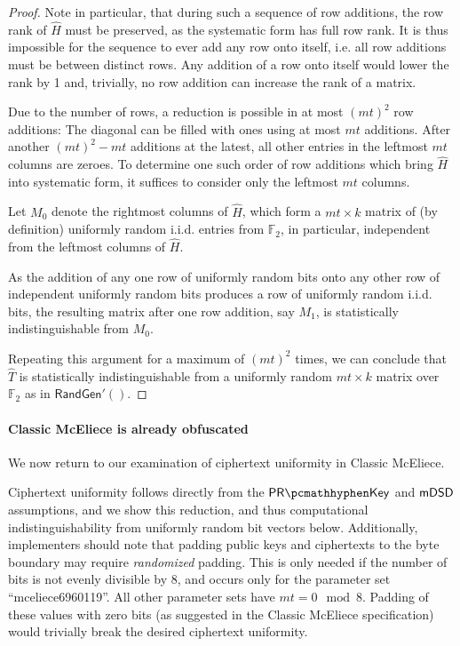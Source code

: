 \begin{proof}
    Note in particular, that during such a sequence of row additions, the row rank of $\hat H$ must be preserved, as the systematic form has full row rank. It is thus impossible for the sequence to ever add any row onto itself, i.e. all row additions must be between distinct rows. Any addition of a row onto itself would lower the rank by 1 and, trivially, no row addition can increase the rank of a matrix.
    
    Due to the number of rows, a reduction is possible in at most $(mt)^2$ row additions: The diagonal can be filled with ones using at most $mt$ additions. After another $(mt)^2-mt$ additions at the latest, all other entries in the leftmost $mt$ columns are zeroes. To determine one such order of row additions which bring $\hat H$ into systematic form, it suffices to consider only the leftmost $mt$ columns.
    
    Let $M_0$ denote the rightmost columns of $\hat H$, which form a $mt \times k$ matrix of (by definition) uniformly random i.i.d. entries from $\mathbb F_2$, in particular, independent from the leftmost columns of $\hat H$.
    
    As the addition of any one row of uniformly random bits onto any other row of independent uniformly random bits produces a row of uniformly random i.i.d. bits, the resulting matrix after one row addition, say $M_1$, is statistically indistinguishable from $M_0$.
    
    Repeating this argument for a maximum of $(mt)^2$ times, we can conclude that $\hat T$ is statistically indistinguishable from a uniformly random $mt \times k$ matrix over $\mathbb F_2$ as in $\mathsf{RandGen}'()$.
\end{proof}

\paragraph{Classic McEliece is already obfuscated}
We now return to our examination of ciphertext uniformity in Classic McEliece.

Ciphertext uniformity follows directly from the $\prkey$ and $\mathsf{mDSD}$ assumptions, and we show this reduction, and thus computational indistinguishability from uniformly random bit vectors below. Additionally, implementers should note that padding public keys and ciphertexts to the byte boundary may require \emph{randomized} padding. This is only needed if the number of bits is not evenly divisible by 8, and occurs only for the parameter set ``mceliece6960119''.  All other parameter sets have $mt = 0 \mod 8$. Padding of these values with zero bits (as suggested in the Classic McEliece specification) would trivially break the desired ciphertext uniformity.

